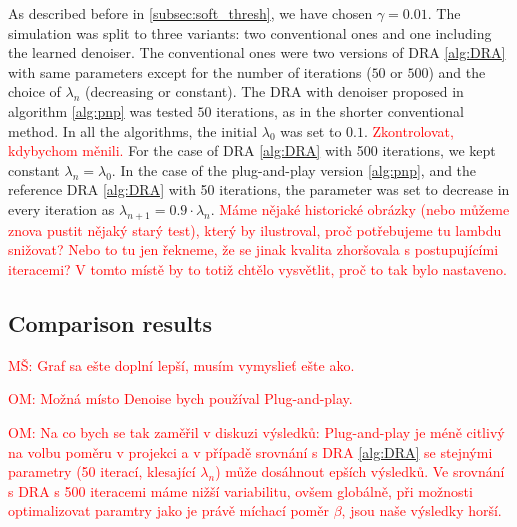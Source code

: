 \documentclass[conference]{IEEEtran}
\newcommand{\todo}[1]{\textcolor{red}{#1}}
\begin{document}
As described before in \ref{subsec:soft_thresh}, we have chosen $\gamma = 0.01$.
The simulation was split to three variants: two conventional ones and one including the learned denoiser.
The conventional ones were two versions of DRA \ref{alg:DRA} with same parameters except for the number of iterations ($50$ or $500$) and the choice of $\lambda_n$ (decreasing or constant).
The DRA with denoiser proposed in algorithm \ref{alg:pnp} was tested $50$ iterations,
as in the shorter conventional method.
In all the algorithms, the initial $\lambda_0$ was set to $0.1$. \todo{Zkontrolovat, kdybychom měnili.}
For the case of DRA \ref{alg:DRA} with 500 iterations, we kept constant $\lambda_n = \lambda_0$.
In the case of the plug-and-play version \ref{alg:pnp}, and the reference DRA \ref{alg:DRA} with 50 iterations, the parameter was set to decrease in every iteration as $\lambda_{n+1} = 0.9\cdot\lambda_n$.
\todo{Máme nějaké historické obrázky (nebo můžeme znova pustit nějaký starý test), který by ilustroval, proč potřebujeme tu lambdu snižovat? Nebo to tu jen řekneme, že se jinak kvalita zhoršovala s postupujícími iteracemi? V tomto místě by to totiž chtělo vysvětlit, proč to tak bylo nastaveno.}



\subsection{Comparison results}



\todo{MŠ: Graf sa ešte doplní lepší, musím vymyslieť ešte ako.}

\todo{OM: Možná místo Denoise bych používal Plug-and-play.}

\todo{OM: Na co bych se tak zaměřil v diskuzi výsledků: Plug-and-play je méně citlivý na volbu poměru v projekci a v případě srovnání s DRA \ref{alg:DRA} se stejnými parametry (50 iterací, klesající $\lambda_n$) může dosáhnout epších výsledků.
Ve srovnání s DRA s 500 iteracemi máme nižší variabilitu, ovšem globálně, při možnosti optimalizovat paramtry jako je právě míchací poměr $\beta$, jsou naše výsledky horší.}
\end{document}
